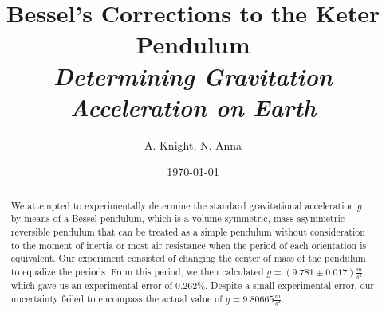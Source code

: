 \usepackage{lgrind}        %
\usepackage{chapterbib}    %
\usepackage{color}         %
\usepackage{graphics}      %
\usepackage[pdftex]{graphicx}      %
\usepackage{longtable}     %
\usepackage{epsf}          %
\usepackage{bm}            %
\usepackage{asymptote}     %
\usepackage{thumbpdf}
\usepackage[colorlinks=true]{hyperref}  %


%
%


\title{Bessel's Corrections to the Keter Pendulum \\ 
\textit{Determining Gravitation Acceleration on Earth}}
\author         {A. Knight, N. Anna}
\date{\today}


\begin{abstract}
We attempted to experimentally determine the standard gravitational acceleration $g$ by means of a Bessel pendulum, which is a volume symmetric, mass asymmetric reversible pendulum that can be treated as a simple pendulum without consideration to the moment of inertia or most air resistance when the period of each orientation is equivalent. Our experiment consisted of changing the center of mass of the pendulum to equalize the periods. From this period, we then calculated $g=(9.781 \pm 0.017) \frac{m}{s^2}$, which gave us an experimental error of $0.262\%$. Despite a small experimental error, our uncertainty failed to encompass the actual value of $g=9.80665 \frac{m}{s^2}$.

\end{abstract}

\maketitle


